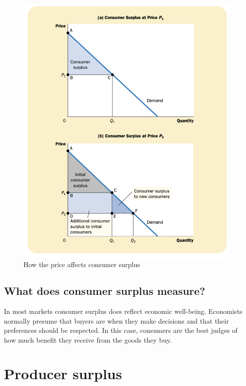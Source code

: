 \begin{figure}[!ht]
  \centering
  \includegraphics[width=\textwidth]{pics/consumer-surplus2}
  \caption{How the price affects consumer surplus}
  \label{fig:consumer-surplus2}
\end{figure}


\subsection{What does consumer surplus measure?}

In most markets consumer surplus does reflect economic well-being.
Economists normally presume that buyers are  when they make decisions and that their preferences should be respected.
In this case, consumers are the best judges of how much benefit they receive from the goods they buy.



\section{Producer surplus}

